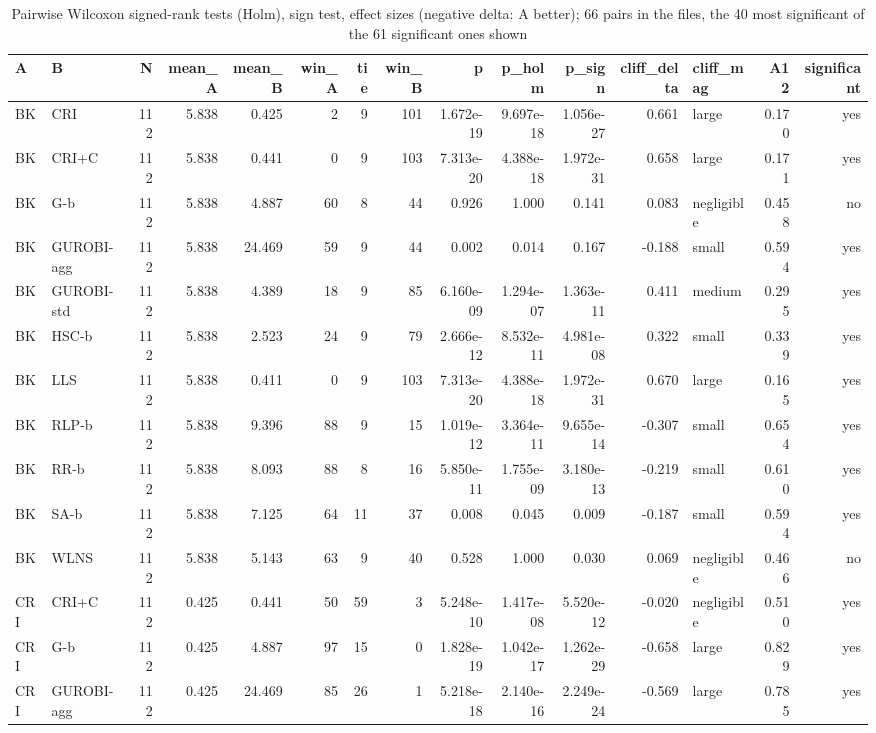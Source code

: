 \begin{table}[htbp]
\centering
\small
\caption{Pairwise Wilcoxon signed-rank tests (Holm), sign test, effect sizes (negative delta: A better); 66 pairs in the files, the 40 most significant of the 61 significant ones shown}
\label{tab:E4a_equal_budgets_b1_pairwise}
\begin{tabular}{llrrrrrrrrrrlrr}
\toprule
A & B & N & mean\_A & mean\_B & win\_A & tie & win\_B & p & p\_holm & p\_sign & cliff\_delta & cliff\_mag & A12 & significant \\
\midrule
BK & CRI & 112 & 5.838 & 0.425 & 2 & 9 & 101 & 1.672e-19 & 9.697e-18 & 1.056e-27 & 0.661 & large & 0.170 & yes \\
BK & CRI+C & 112 & 5.838 & 0.441 & 0 & 9 & 103 & 7.313e-20 & 4.388e-18 & 1.972e-31 & 0.658 & large & 0.171 & yes \\
BK & G-b & 112 & 5.838 & 4.887 & 60 & 8 & 44 & 0.926 & 1.000 & 0.141 & 0.083 & negligible & 0.458 & no \\
BK & GUROBI-agg & 112 & 5.838 & 24.469 & 59 & 9 & 44 & 0.002 & 0.014 & 0.167 & -0.188 & small & 0.594 & yes \\
BK & GUROBI-std & 112 & 5.838 & 4.389 & 18 & 9 & 85 & 6.160e-09 & 1.294e-07 & 1.363e-11 & 0.411 & medium & 0.295 & yes \\
BK & HSC-b & 112 & 5.838 & 2.523 & 24 & 9 & 79 & 2.666e-12 & 8.532e-11 & 4.981e-08 & 0.322 & small & 0.339 & yes \\
BK & LLS & 112 & 5.838 & 0.411 & 0 & 9 & 103 & 7.313e-20 & 4.388e-18 & 1.972e-31 & 0.670 & large & 0.165 & yes \\
BK & RLP-b & 112 & 5.838 & 9.396 & 88 & 9 & 15 & 1.019e-12 & 3.364e-11 & 9.655e-14 & -0.307 & small & 0.654 & yes \\
BK & RR-b & 112 & 5.838 & 8.093 & 88 & 8 & 16 & 5.850e-11 & 1.755e-09 & 3.180e-13 & -0.219 & small & 0.610 & yes \\
BK & SA-b & 112 & 5.838 & 7.125 & 64 & 11 & 37 & 0.008 & 0.045 & 0.009 & -0.187 & small & 0.594 & yes \\
BK & WLNS & 112 & 5.838 & 5.143 & 63 & 9 & 40 & 0.528 & 1.000 & 0.030 & 0.069 & negligible & 0.466 & no \\
CRI & CRI+C & 112 & 0.425 & 0.441 & 50 & 59 & 3 & 5.248e-10 & 1.417e-08 & 5.520e-12 & -0.020 & negligible & 0.510 & yes \\
CRI & G-b & 112 & 0.425 & 4.887 & 97 & 15 & 0 & 1.828e-19 & 1.042e-17 & 1.262e-29 & -0.658 & large & 0.829 & yes \\
CRI & GUROBI-agg & 112 & 0.425 & 24.469 & 85 & 26 & 1 & 5.218e-18 & 2.140e-16 & 2.249e-24 & -0.569 & large & 0.785 & yes \\

\end{tabular}
\end{table}
